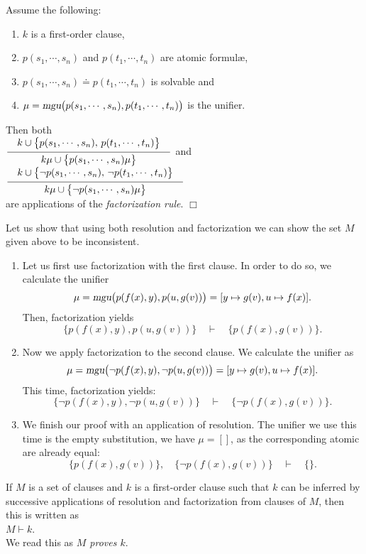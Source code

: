  

\begin{Definition}[Factorization] Assume the following:
\begin{enumerate}
\item $k$ is a first-order clause,
\item $p(s_1,\cdots,s_n)$ and $p(t_1,\cdots,t_n)$ are atomic formul\ae,
\item $p(s_1,\cdots,s_n)  \doteq p(t_1,\cdots,t_n)$ is solvable and 
\item $\mu = \textsl{mgu}\bigl(p(s_1,\cdots,s_n), p(t_1,\cdots,t_n)\bigr)$ is the unifier.
\end{enumerate}
Then both \\[0.3cm]
\hspace*{0.8cm}
$\schluss{k \cup \bigl\{p(s_1,\cdots,s_n),\, p(t_1,\cdots,t_n)\bigl\}}{k\mu \cup \bigl\{p(s_1,\cdots,s_n)\mu\bigr\} }$ 
\quad and \quad
$\schluss{k \cup \bigl\{ \neg p(s_1,\cdots,s_n),\, \neg p(t_1,\cdots,t_n)\bigl\}}{k\mu \cup \bigl\{\neg p(s_1,\cdots,s_n)\mu\bigr\} }$ 
\\[0.3cm]
are applications of the  \emph{factorization rule}.
\hspace*{\fill} $\Box$
\end{Definition}

\noindent
Let us show that using both resolution and factorization we can show the set $M$ given above to be
inconsistent. 
\begin{enumerate}
\item Let us first use factorization with the first clause.
      In order to do so, we calculate the unifier 
      \[ \mu = \textsl{mgu}\bigl(p(f(x),y), p(u,g(v))\bigr) = [y \mapsto g(v), u \mapsto f(x)]. \]
      Then, factorization yields 
      \[ \bigl\{p(f(x),y), p(u,g(v))\bigr\} \quad \vdash \quad \bigl\{p(f(x),g(v))\bigr\}. \]
\item Now we apply factorization to the second clause.  We calculate the unifier as
      \[ \mu = \textsl{mgu}\bigl(\neg p(f(x),y), \neg p(u,g(v))\bigr) = [y \mapsto g(v), u \mapsto f(x)]. 
      \]
      This time, factorization yields: 
      \[ \bigl\{ \neg p(f(x),y), \neg p(u,g(v))\bigr\} \quad \vdash \quad \bigl\{\neg p(f(x),g(v))\bigr\}.
      \]
\item We finish our proof with an application of resolution.  The unifier we use this time is the empty
      substitution, we have $\mu = []$, as the corresponding atomic \formulae are already equal:
      \[ \bigl\{p(f(x),g(v))\bigr\}, \quad \bigl\{\neg p(f(x),g(v))\bigr\} \quad \vdash \quad \{\}. \]
\end{enumerate}
If $M$ is a set of clauses and  $k$ is a first-order clause such that $k$ can be inferred by successive 
applications of resolution and factorization from clauses of  $M$, then this is written as
\\[0.2cm]
\hspace*{1.3cm} $M \vdash k$.
\\[0.2cm]
We read this as  \emph{$M$ proves $k$}.

